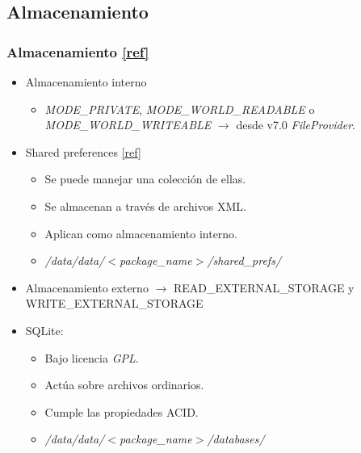 \subsection{Almacenamiento}
\begin{frame}
  \frametitle{Almacenamiento \href{https://developer.android.com/guide/topics/data/data-storage}{[ref]}}
  \begin{itemize}
      \item Almacenamiento interno
      \begin{itemize}    
          \item \textit{MODE\_PRIVATE}, \textit{MODE\_WORLD\_READABLE} o \textit{MODE\_WORLD\_WRITEABLE} $\rightarrow$ desde v7.0 \textit{FileProvider}.
      \end{itemize}

      \item Shared preferences \href{https://developer.android.com/guide/topics/data/data-storage.html}{[ref]}
      \begin{itemize}
    \item Se puede manejar una colección de ellas.
    
    \item Se almacenan a través de archivos XML.
        
    \item Aplican como almacenamiento interno.
    
    \item \textit{/data/data/$<$package\_name$>$/shared\_prefs/}
      \end{itemize}
    \item Almacenamiento externo $\rightarrow$ READ\_EXTERNAL\_STORAGE y WRITE\_EXTERNAL\_STORAGE
      \item SQLite: 
      \begin{itemize}
    \item Bajo licencia \textit{GPL}.
    
    \item Actúa sobre archivos ordinarios.

    \item Cumple las propiedades ACID.
    
    \item \textit{/data/data/$<$package\_name$>$/databases/}
      \end{itemize}
  \end{itemize}
\end{frame}

